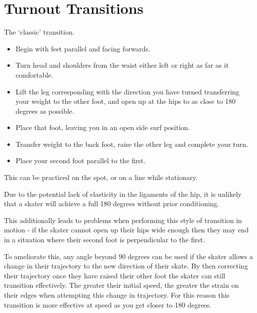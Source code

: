 \section{Turnout Transitions}
\label{sec:transitions/turnout}

The `classic' transition.

\begin{itemize}
\item Begin with feet parallel and facing forwards. 
\item Turn head and shoulders from the waist either left or right as far as it comfortable.   
\item Lift the leg corresponding with the direction you have turned transferring your weight to the other foot, and open up at the hips to as close to 180 degrees as possible.     
\item Place that foot, leaving you in an open side surf position.  
\item Transfer weight to the back foot, raise the other leg and complete your turn.   
\item Place your second foot parallel to the first. 
\end{itemize}

This can be practiced on the spot, or on a line while stationary. 

Due to the potential lack of elasticity in the ligaments of the hip, it is unlikely that a skater will achieve a full 180 degrees without prior conditioning.

This additionally leads to problems when performing this style of transition in motion - if the skater cannot open up their hips wide enough then they may end in a situation where their second foot is perpendicular to the first.

To ameliorate this, any angle beyond 90 degrees can be used if the skater allows a change in their trajectory to the new direction of their skate.
By then correcting their trajectory once they have raised their other foot the skater can still transition effectively.   
The greater their initial speed, the greater the strain on their edges when attempting this change in trajectory. 
For this reason this transition is more effective at speed as you get closer to 180 degrees.
